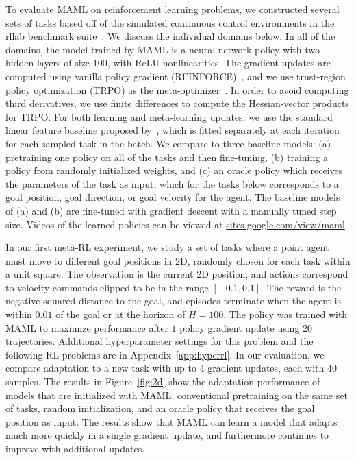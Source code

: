 \documentclass{article}
\begin{document}
To evaluate MAML on reinforcement learning problems, we constructed several sets of tasks based off of the simulated continuous control environments in the rllab benchmark suite~\cite{benchmarking}. We discuss the individual domains below. In all of the domains, the model trained by MAML is a neural network policy with two hidden layers of size $100$, with ReLU nonlinearities. The gradient updates are computed using vanilla policy gradient (REINFORCE)~\cite{reinforce}, and we use trust-region policy optimization (TRPO) as the meta-optimizer~\cite{trpo}. In order to avoid computing third derivatives, we use finite differences to compute the Hessian-vector products for TRPO. For both learning and meta-learning updates, we use the standard linear feature baseline proposed by~\citet{benchmarking}, which is fitted separately at each iteration for each sampled task in the batch. We compare to three baseline models: (a) pretraining one policy on all of the tasks and then fine-tuning, (b) training a policy from randomly initialized weights, and (c) an oracle policy which receives the parameters of the task as input, which for the tasks below corresponds to a goal position, goal direction, or goal velocity for the agent. The baseline models of (a) and (b) are fine-tuned with gradient descent with a manually tuned step size. Videos of the learned policies can be viewed at \mbox{\url{sites.google.com/view/maml}}


\vspace{-0.1cm}
In our first meta-RL experiment, we study a set of tasks where a point agent must move to different goal positions in 2D, randomly chosen for each task within a unit square. The observation is the current 2D position, and actions correspond to velocity commands clipped to be in the range $[-0.1,0.1]$. The reward is the negative squared distance to the goal, and episodes terminate when the agent is within $0.01$ of the goal or at the horizon of $H=100$. The policy was trained with MAML to maximize performance after $1$ policy gradient update using $20$ trajectories. Additional hyperparameter settings for this problem and the following RL problems are in Appendix~\ref{app:hyperrl}.
In our evaluation, we compare adaptation to a new task with up to 4 gradient updates, each with $40$ samples. The results in Figure~\ref{fig:2d} show the adaptation performance of models that are initialized with MAML, conventional pretraining on the same set of tasks, random initialization, and an oracle policy that receives the goal position as input. The results show that MAML can learn a model that adapts much more quickly in a single gradient update, and furthermore continues to improve with additional updates.
\end{document}
